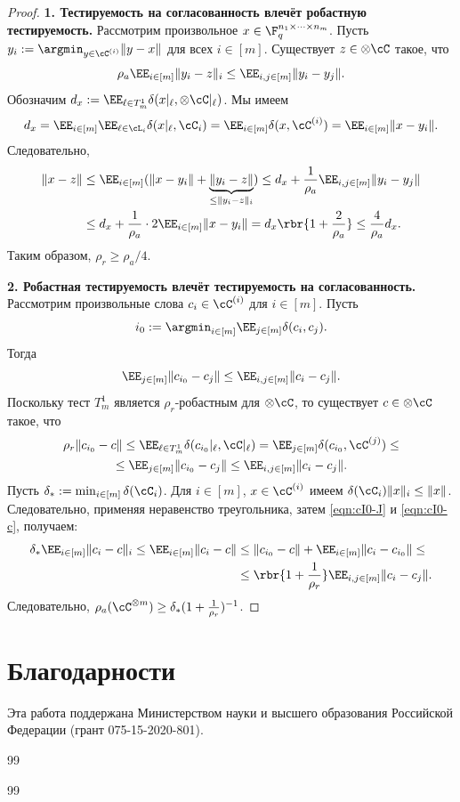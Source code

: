 \documentclass[russian]{intsys}
\begin{document}
\begin{proof}
    \textbf{1. Тестируемость на согласованность влечёт робастную тестируемость.} Рассмотрим произвольное $x\in \F_q^{n_1\times \cdots\times n_m}$. Пусть $y_i:=\argmin_{y\in \cC^{(i)}}\|y-x\|$ для всех $i\in [m]$. Существует $z\in\otimes\cC$ такое, что 
    \[
    \rho_a\EE_{i\in[m]} \|y_i-z\|_i\le \EE_{i,j\in[m]}\|y_i-y_j\|.
    \]
    Обозначим $d_x:=\EE_{\ell\in T_m^1}\delta(x|_\ell, \otimes\cC|_{\ell})$. Мы имеем 
    \[
    d_x = \EE_{i\in[m]}\EE_{\ell\in\cL_i}\delta(x|_\ell, \cC_i)=\EE_{i\in[m]}\delta(x,\cC^{(i)})=\EE_{i\in[m]}\|x-y_i\|.
    \]
    Следовательно,
    \begin{align*}
    \|x-z\| &\le \EE_{i\in[m]}(\|x-y_i\|+\underbrace{\|y_i-z\|}_{\le\|y_i-z\|_i}) 
    \le d_x+\frac1{\rho_a}\EE_{i,j\in[m]}\|y_i-y_j\| \\
    &\le d_x+\frac1{\rho_a}\cdot 2\EE_{i\in [m]}\|x-y_i\|=d_x\rbr{1+\frac{2}{\rho_a}}\le \frac{4}{\rho_a}d_x.
    \end{align*}
    Таким образом, $\rho_r\ge \rho_a/4$.
    
    \textbf{2. Робастная тестируемость влечёт тестируемость на согласованность.} 
    Рассмотрим произвольные слова $c_i\in \cC^{(i)}$ для $i\in [m]$.
    Пусть 
    $$i_0:=\argmin_{i\in[m]}\EE_{j\in [m]}\delta(c_i, c_j).$$
    Тогда
    \begin{equation}\label{eqn:cI0-J}
    \EE_{j\in[m]}\|c_{i_0}- c_j\|\le \EE_{i,j\in[m]}\|c_i - c_j\|.
    \end{equation}
    Поскольку тест $T_m^1$ является $\rho_r$-робастным для $\otimes\cC$, то существует $c\in\otimes\cC$ такое, что 
    \begin{multline}
    \label{eqn:cI0-c}
    \rho_r \|c_{i_0}-c\|\le \EE_{\ell\in T_{m}^1}\delta(c_{i_0}|_{\ell}, \cC|_{\ell})= \EE_{j\in [m]}\delta(c_{i_0}, \cC^{(j)})\le\\
    \le\EE_{j\in[m]}\|c_{i_0} - c_j\|\le \EE_{i,j\in[m]}\|c_i- c_j\|.
    \end{multline}
    Пусть $\delta_*:=\min_{i\in[m]}\delta(\cC_i)$. Для $i\in[m]$, $x\in\cC^{(i)}$ имеем $\delta(\cC_i)\|x\|_i\le \|x\|$. Следовательно, применяя неравенство треугольника, затем \eqref{eqn:cI0-J} и \eqref{eqn:cI0-c}, получаем:
    \begin{align*}
    \delta_*\EE_{i\in[m]}\|c_i-c\|_i\le \EE_{i\in[m]}\|c_i-c\|
    &\le \|c_{i_0}-c\|+\EE_{i\in[m]}\|c_i-c_{i_0}\|\le
    \\
    &\le \rbr{1+\frac1{\rho_r}}\EE_{i,j\in[m]}\|c_i-c_j\|.
    \end{align*}
    Следовательно, 
    $\rho_a(\cC^{\otimes m})\ge\delta_*(1+\frac1{\rho_r})^{-1}$.
\end{proof}

\section*{Благодарности}

Эта работа поддержана Министерством науки и высшего образования Российской Федерации (грант 075-15-2020-801).

\begin{thebibliographyRU}{99}
    
\end{thebibliographyRU}

\begin{thebibliographyEN}{99}
    
\end{thebibliographyEN}
\end{document}
